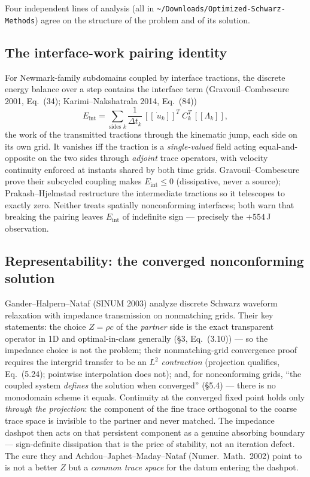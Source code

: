 \documentclass[11pt]{article}
\newcommand{\code}[1]{\texttt{#1}}
\newcommand{\jump}[1]{[\![#1]\!]}
\begin{document}
Four independent lines of analysis (all in
\code{\textasciitilde/Downloads/Optimized-Schwarz-Methods}) agree on the
structure of the problem and of its solution.

\subsection{The interface-work pairing identity}

For Newmark-family subdomains coupled by interface tractions, the discrete
energy balance over a step contains the interface term
(Gravouil--Combescure 2001, Eq.~(34); Karimi--Nakshatrala 2014, Eq.~(84))
\begin{equation}
  E_{\mathrm{int}}
  = \sum_{\text{sides }k} \frac{1}{\Delta t_k}\,
    \jump{\dot{~u}_k}^{T} ~C_k^{T}\, \jump{\Lambda_k},
  \label{eq:eint}
\end{equation}
the work of the transmitted tractions through the kinematic jump, each side on
its own grid. It vanishes iff the traction is a \emph{single-valued} field
acting equal-and-opposite on the two sides through \emph{adjoint} trace
operators, with velocity continuity enforced at instants shared by both time
grids. Gravouil--Combescure prove their subcycled coupling makes
$E_{\mathrm{int}} \le 0$ (dissipative, never a source);
Prakash--Hjelmstad restructure the intermediate tractions so it telescopes to
exactly zero. Neither treats spatially nonconforming interfaces; both warn
that breaking the pairing leaves $E_{\mathrm{int}}$ of indefinite sign ---
precisely the $+554$\,J observation.

\subsection{Representability: the converged nonconforming solution}

Gander--Halpern--Nataf (SINUM 2003) analyze discrete Schwarz waveform
relaxation with impedance transmission on nonmatching grids. Their key
statements: the choice $Z = \rho c$ of the \emph{partner} side is the exact
transparent operator in 1D and optimal-in-class generally (\S3, Eq.~(3.10)) ---
so the impedance choice is not the problem; their nonmatching-grid convergence
proof requires the intergrid transfer to be an $L^2$ \emph{contraction}
(projection qualifies, Eq.~(5.24); pointwise interpolation does not); and, for
nonconforming grids, ``the coupled system \emph{defines} the solution when
converged'' (\S5.4) --- there is no monodomain scheme it equals. Continuity at
the converged fixed point holds only \emph{through the projection}: the
component of the fine trace orthogonal to the coarse trace space is invisible
to the partner and never matched. The impedance dashpot then acts on that
persistent component as a genuine absorbing boundary --- sign-definite
dissipation that is the price of stability, not an iteration defect. The cure
they and Achdou--Japhet--Maday--Nataf (Numer.\ Math.\ 2002) point to is not a
better $Z$ but a \emph{common trace space} for the datum entering the dashpot.
\end{document}

